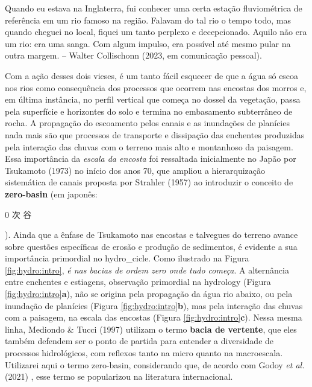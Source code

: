 \documentclass[./main.tex]{subfiles}
\begin{document}
\begin{adjustwidth}{100pt}{0pt}
\medskip
\small Quando eu estava na Inglaterra, fui conhecer uma certa estação fluviométrica de referência em um rio famoso na região. Falavam do tal rio o tempo todo, mas quando cheguei no local, fiquei um tanto perplexo e decepcionado. Aquilo não era um rio: era uma sanga. Com algum impulso, era possível até mesmo pular na outra margem. -- Walter Collischonn (2023, em comunicação pessoal).
\medskip
\end{adjustwidth}

\noindent Com a ação desses dois vieses, é um tanto fácil esquecer de que a água só escoa nos rios como consequência dos processos que ocorrem nas encostas dos morros e, em última instância, no perfil vertical que começa no dossel da vegetação, passa pela superfície e horizontes do solo e termina no embasamento subterrâneo de rocha. A propagação do escoamento pelos canais e as inundações de planícies nada mais são que processos de transporte e dissipação das enchentes produzidas pela interação das chuvas com o terreno mais alto e montanhoso da paisagem. Essa importância da \textit{escala da encosta} foi ressaltada inicialmente no Japão por Tsukamoto (1973) \cite{tsukamoto1973} no início dos anos 70, que ampliou a hierarquização sistemática de canais proposta por Strahler (1957) \cite{strahler1957} ao introduzir o conceito de \textbf{\gls{zero-basin}} (em japonês: \begin{CJK}{UTF8}{min}0 次 谷\end{CJK}). Ainda que a ênfase de Tsukamoto nas encostas e talvegues do terreno avance sobre questões específicas de erosão e produção de sedimentos, é evidente a sua importância primordial no \gls{hydro_cicle}. Como ilustrado na Figura \ref{fig:hydro:intro}, \textit{é nas bacias de ordem zero onde tudo começa}. A alternância entre enchentes e estiagens, observação primordial na \gls{hydrology} (Figura \ref{fig:hydro:intro}\textbf{a}), não se origina pela propagação da água rio abaixo, ou pela inundação de planícies (Figura \ref{fig:hydro:intro}\textbf{b}), mas pela interação das chuvas com a paisagem, na escala das encostas (Figura \ref{fig:hydro:intro}\textbf{c}). Nessa mesma linha, Mediondo \& Tucci (1997) \cite{mediondo1997} utilizam o termo \textbf{bacia de vertente}, que eles também defendem ser o ponto de partida para entender a diversidade de processos hidrológicos, com reflexos tanto na micro quanto na macroescala. Utilizarei aqui o termo \gls{zero-basin}, considerando que, de acordo com Godoy \textit{et al.} (2021) \cite{godoy2021}, esse termo se popularizou na literatura internacional.
\end{document}
